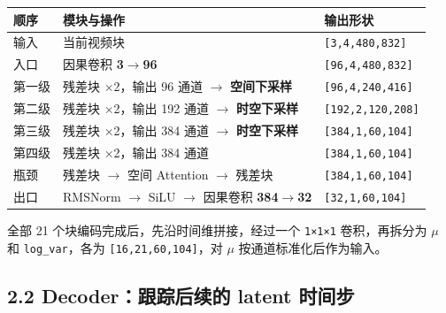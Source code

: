 \documentclass[
  11pt,
  a4paper,
  fontset=none]{ctexart}
\newcounter{none} %
\begin{document}
{\def\LTcaptype{none} %
\begin{longtable}[]{@{}
  >{\raggedright\arraybackslash}p{}
  >{\raggedright\arraybackslash}p{}
  >{\raggedright\arraybackslash}p{}@{}}
\toprule\noalign{}
\begin{minipage}[b]{\linewidth}\raggedright
顺序
\end{minipage} & \begin{minipage}[b]{\linewidth}\raggedright
模块与操作
\end{minipage} & \begin{minipage}[b]{\linewidth}\raggedright
输出形状
\end{minipage} \\
\midrule\noalign{}
\endhead
\bottomrule\noalign{}
\endlastfoot
输入 & 当前视频块 & \texttt{{[}3,4,480,832{]}} \\
入口 & 因果卷积 \textbf{3\(\rightarrow\)96} &
\texttt{{[}96,4,480,832{]}} \\
第一级 & 残差块 ×2，输出 96 通道 \(\rightarrow\) \textbf{空间下采样} &
\texttt{{[}96,4,240,416{]}} \\
第二级 & 残差块 ×2，输出 192 通道 \(\rightarrow\) \textbf{时空下采样} &
\texttt{{[}192,2,120,208{]}} \\
第三级 & 残差块 ×2，输出 384 通道 \(\rightarrow\) \textbf{时空下采样} &
\texttt{{[}384,1,60,104{]}} \\
第四级 & 残差块 ×2，输出 384 通道 & \texttt{{[}384,1,60,104{]}} \\
瓶颈 & 残差块 \(\rightarrow\) 空间 Attention \(\rightarrow\) 残差块 &
\texttt{{[}384,1,60,104{]}} \\
出口 & RMSNorm \(\rightarrow\) SiLU \(\rightarrow\) 因果卷积
\textbf{384\(\rightarrow\)32} & \texttt{{[}32,1,60,104{]}} \\
\end{longtable}
}

\endgroup

全部 21 个块编码完成后，先沿时间维拼接，经过一个 \texttt{1×1×1}
卷积，再拆分为 \(\mu\) 和 \texttt{log\_var}，各为
\texttt{{[}16,21,60,104{]}}，对 \(\mu\) 按通道标准化后作为输入。


\subsection{2.2 Decoder：跟踪后续的 latent 时间步}\label{wan21-decoder}
\end{document}
